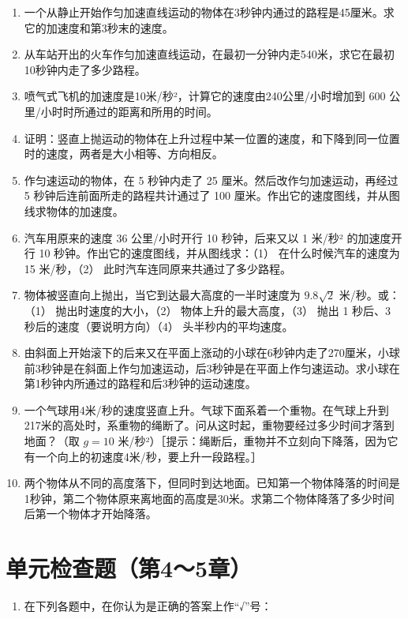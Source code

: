 \begin{enumerate}
\def\labelenumi{\arabic{enumi}.}
\item
  一个从静止开始作匀加速直线运动的物体在3秒钟内通过的路程是45厘米。求它的加速度和第3秒末的速度。
\item
  从车站开出的火车作匀加速直线运动，在最初一分钟内走540米，求它在最初10秒钟内走了多少路程。
\item
  喷气式飞机的加速度是10米/秒²，计算它的速度由240公里/小时增加到 600
  公里/小时时所通过的距离和所用的时间。
\item
  证明：竖直上抛运动的物体在上升过程中某一位置的速度，和下降到同一位置时的速度，两者是大小相等、方向相反。
\item
  作匀速运动的物体，在 5 秒钟内走了 25 厘米。然后改作匀加速运动，再经过
  5 秒钟后连前面所走的路程共计通过了 100
  厘米。作出它的速度图线，并从图线求物体的加速度。
\item
  汽车用原来的速度 36 公里/小时开行 10 秒钟，后来又以 1 米/秒²
  的加速度开行 10 秒钟。作出它的速度图线，并从图线求：（1）
  在什么时候汽车的速度为 15 米/秒，（2）
  此时汽车连同原来共通过了多少路程。
\item
  物体被竖直向上抛出，当它到达最大高度的一半时速度为 \(9.8\sqrt{2}\)
  米/秒。或：（1） 抛出时速度的大小，（2） 物体上升的最大高度，（3）
  抛出 1 秒后、3 秒后的速度（要说明方向）（4） 头半秒内的平均速度。
\item
  由斜面上开始滚下的后来又在平面上涨动的小球在6秒钟内走了270厘米，小球前3秒钟是在斜面上作匀加速运动，后3秒钟是在平面上作匀速运动。求小球在第1秒钟内所通过的路程和后3秒钟的运动速度。
\item
  一个气球用4米/秒的速度竖直上升。气球下面系着一个重物。在气球上升到217米的高处时，系重物的绳断了。问从这时起，重物要经过多少时间才落到地面？（取
  \(g = 10\)
  米/秒²）［提示：绳断后，重物并不立刻向下降落，因为它有一个向上的初速度4米/秒，要上升一段路程。］
\item
  两个物体从不同的高度落下，但同时到达地面。已知第一个物体降落的时间是1秒钟，第二个物体原来离地面的高度是30米。求第二个物体降落了多少时间后第一个物体才开始降落。
\end{enumerate}

\chapter{单元检查题（第4～5章）}\label{ux5355ux5143ux68c0ux67e5ux9898ux7b2c45ux7ae0}

\begin{enumerate}
\def\labelenumi{\arabic{enumi}.}
\tightlist
\item
  在下列各题中，在你认为是正确的答案上作``√''号：
\end{enumerate}

